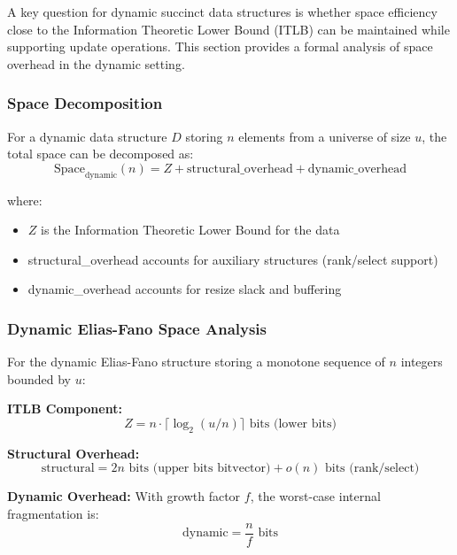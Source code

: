 A key question for dynamic succinct data structures is whether space efficiency close to the Information Theoretic Lower Bound (ITLB) can be maintained while supporting update operations. This section provides a formal analysis of space overhead in the dynamic setting.

\subsubsection{Space Decomposition}

For a dynamic data structure $D$ storing $n$ elements from a universe of size $u$, the total space can be decomposed as:
\begin{equation}
    \text{Space}_{\text{dynamic}}(n) = Z + \text{structural\_overhead} + \text{dynamic\_overhead}
    \label{eq:space-decomp}
\end{equation}

where:
\begin{itemize}
    \item $Z$ is the Information Theoretic Lower Bound for the data
    \item structural\_overhead accounts for auxiliary structures (rank/select support)
    \item dynamic\_overhead accounts for resize slack and buffering
\end{itemize}

\subsubsection{Dynamic Elias-Fano Space Analysis}

For the dynamic Elias-Fano structure storing a monotone sequence of $n$ integers bounded by $u$:

\textbf{ITLB Component:}
\begin{equation}
    Z = n \cdot \lceil \log_2(u/n) \rceil \text{ bits (lower bits)}
\end{equation}

\textbf{Structural Overhead:}
\begin{equation}
    \text{structural} = 2n \text{ bits (upper bits bitvector)} + o(n) \text{ bits (rank/select)}
\end{equation}

\textbf{Dynamic Overhead:}
With growth factor $f$, the worst-case internal fragmentation is:
\begin{equation}
    \text{dynamic} = \frac{n}{f} \text{ bits}
\end{equation}

